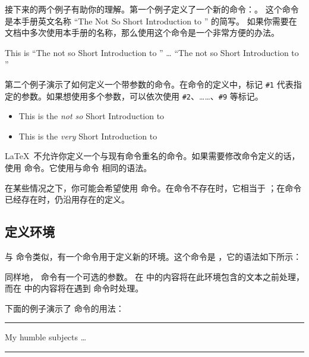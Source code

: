 接下来的两个例子有助你的理解。第一个例子定义了一个新的命令：。
这个命令是本手册英文名称 ``The Not So Short Introduction to \LaTeXe'' 的简写。
如果你需要在文档中多次使用本手册的名称，那么使用这个命令是一个非常方便的办法。

\begin{example}
\newcommand{\tnss}{The not
    so Short Introduction to
    \LaTeXe}
This is ``\tnss'' \ldots{}
``\tnss''
\end{example}

第二个例子演示了如何定义一个带参数的命令。在命令的定义中，标记 \verb|#1| 
代表指定的参数。如果想使用多个参数，可以依次使用 \verb|#2|、……、\verb|#9| 等标记。

\begin{example}
\newcommand{\txsit}[1]
 {This is the \emph{#1} Short
      Introduction to \LaTeXe}
\begin{itemize}
\item \txsit{not so}
\item \txsit{very}
\end{itemize}
\end{example}

\LaTeX\ 不允许你定义一个与现有命令重名的命令。如果需要修改命令定义的话，使用  命令。它使用与命令 
相同的语法。

在某些情况之下，你可能会希望使用  命令。在命令不存在时，它相当于  
；在命令已经存在时，仍沿用存在的定义。

\subsection{定义环境}

与  命令类似，有一个命令用于定义新的环境。这个命令是 ，它的语法如下所示：

\begin{command}
\end{command}

同样地， 命令有一个可选的参数。
在  中的内容将在此环境包含的文本之前处理，而在  中的内容将在遇到  命令时处理。

下面的例子演示了  命令的用法：
\begin{example}
\newenvironment{king}
{\rule{1ex}{1ex}%
     \hspace{\stretch{1}}}
{%
     \rule{1ex}{1ex}}

\begin{king}
My humble subjects \ldots
\end{king}
\end{example}

